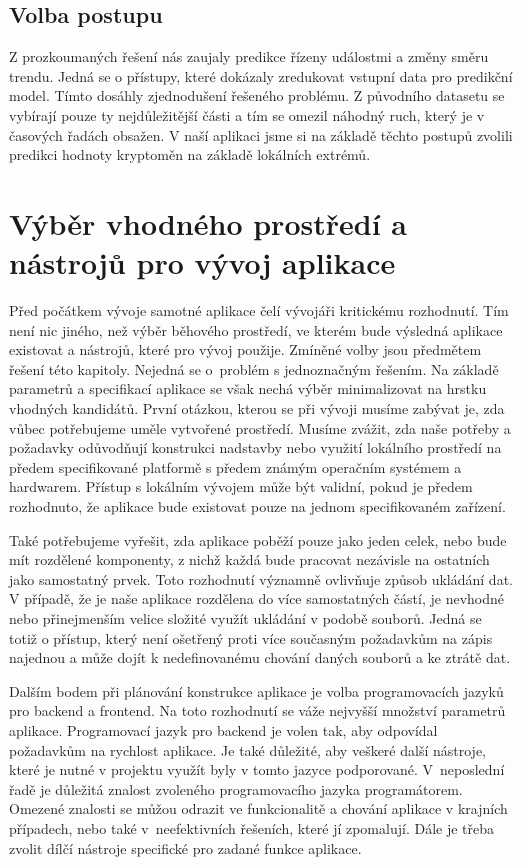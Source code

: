 \section{Volba postupu}

Z prozkoumaných řešení nás zaujaly predikce řízeny událostmi a změny směru trendu. 
Jedná se o přístupy, které dokázaly zredukovat vstupní data pro predikční model.
Tímto dosáhly zjednodušení řešeného problému. Z původního datasetu se vybírají pouze ty nejdůležitější části a tím se omezil náhodný ruch, který je v časových řadách obsažen. 
V naší aplikaci jsme si na základě těchto postupů zvolili predikci hodnoty kryptoměn na základě lokálních extrémů.

\chapter{Výběr vhodného prostředí a nástrojů pro vývoj aplikace}

Před počátkem vývoje samotné aplikace čelí vývojáři kritickému rozhodnutí. 
Tím není nic jiného, než výběr běhového prostředí, ve kterém bude výsledná aplikace existovat a nástrojů, které pro vývoj použije.
Zmíněné volby jsou předmětem řešení této kapitoly. 
Nejedná se o~problém s jednoznačným řešením. 
Na základě parametrů a specifikací aplikace se však nechá výběr minimalizovat na hrstku vhodných kandidátů. 
První otázkou, kterou se při vývoji musíme zabývat je, zda vůbec potřebujeme uměle vytvořené prostředí. 
Musíme zvážit, zda naše potřeby a požadavky odůvodňují konstrukci nadstavby nebo využití lokálního prostředí na předem specifikované platformě s předem známým operačním systémem a hardwarem. 
Přístup s lokálním vývojem může být validní, pokud je předem rozhodnuto, že aplikace bude existovat pouze na jednom specifikovaném zařízení. 

Také potřebujeme vyřešit, zda aplikace poběží pouze jako jeden celek, nebo bude mít rozdělené komponenty, z nichž každá bude pracovat nezávisle na ostatních jako samostatný prvek. 
Toto rozhodnutí významně ovlivňuje způsob ukládání dat. 
V případě, že je naše aplikace rozdělena do více samostatných částí, je nevhodné nebo přinejmenším velice složité využít ukládání v podobě souborů. 
Jedná se totiž o přístup, který není ošetřený proti více současným požadavkům na zápis najednou a může dojít k nedefinovanému chování daných souborů a ke ztrátě dat.

Dalším bodem při plánování konstrukce aplikace je volba programovacích jazyků pro backend a frontend. 
Na toto rozhodnutí se váže nejvyšší množství parametrů aplikace. 
Programovací jazyk pro backend je volen tak, aby odpovídal požadavkům na rychlost aplikace. 
Je také důležité, aby veškeré další nástroje, které je nutné v projektu využít byly v tomto jazyce podporované. 
V~neposlední řadě je důležitá znalost zvoleného programovacího jazyka programátorem. 
Omezené znalosti se můžou odrazit ve funkcionalitě a chování aplikace v krajních případech, nebo také v~neefektivních řešeních, které jí zpomalují. 
Dále je třeba zvolit dílčí nástroje specifické pro zadané funkce aplikace.

